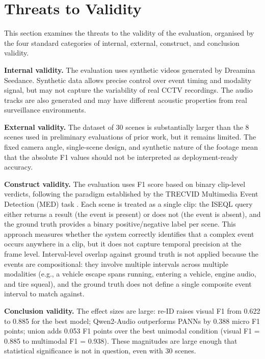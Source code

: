 \section{Threats to Validity}
\label{sec:disc-threats}

This section examines the threats to the validity of the evaluation, organised by the four standard categories of internal, external, construct, and conclusion validity.

\textbf{Internal validity.} The evaluation uses synthetic videos generated by Dreamina Seedance. Synthetic data allows precise control over event timing and modality signal, but may not capture the variability of real CCTV recordings. The audio tracks are also generated and may have different acoustic properties from real surveillance environments.

\textbf{External validity.} The dataset of 30 scenes is substantially larger than the 8 scenes used in preliminary evaluations of prior work, but it remains limited. The fixed camera angle, single-scene design, and synthetic nature of the footage mean that the absolute F1 values should not be interpreted as deployment-ready accuracy.

\textbf{Construct validity.} The evaluation uses F1 score based on binary clip-level verdicts, following the paradigm established by the TRECVID Multimedia Event Detection (MED) task \citep{over2014trecvid}. Each scene is treated as a single clip: the ISEQL query either returns a result (the event is present) or does not (the event is absent), and the ground truth provides a binary positive/negative label per scene. This approach measures whether the system correctly identifies that a complex event occurs anywhere in a clip, but it does not capture temporal precision at the frame level. Interval-level overlap against ground truth is not applied because the events are compositional: they involve multiple intervals across multiple modalities (e.g., a vehicle escape spans running, entering a vehicle, engine audio, and tire squeal), and the ground truth does not define a single composite event interval to match against.

\textbf{Conclusion validity.} The effect sizes are large: re-ID raises visual F1 from 0.622 to 0.885 for the best model; Qwen2-Audio outperforms PANNs by 0.388 micro F1 points; union adds 0.053 F1 points over the best unimodal condition (visual F1 = 0.885 to multimodal F1 = 0.938). These magnitudes are large enough that statistical significance is not in question, even with 30 scenes.

